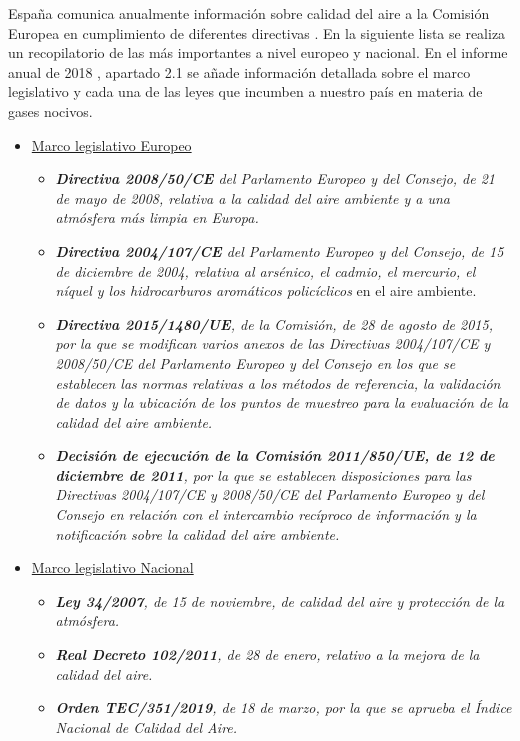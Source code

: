 España comunica anualmente información sobre calidad del aire a la Comisión Europea en cumplimiento de diferentes directivas . En la siguiente lista se realiza un recopilatorio de las más importantes a nivel europeo y nacional. En el informe anual de 2018 \cite{informe_2018}, apartado 2.1 se añade información detallada sobre el marco legislativo y cada una de las leyes que incumben a nuestro país en materia de gases nocivos.

\begin{itemize}
\item  \underline{Marco legislativo Europeo}
	\begin{itemize}
	\item \textit{\textbf{Directiva 2008/50/CE} del Parlamento Europeo y del Consejo, de 21 de mayo de 2008, relativa a la calidad del aire ambiente y a una atmósfera más limpia en Europa.}
	\item \textit{\textbf{Directiva 2004/107/CE} del Parlamento Europeo y del Consejo, de 15 de diciembre de 2004, relativa al arsénico, el cadmio, el mercurio, el níquel y los hidrocarburos aromáticos policíclicos}
	en el aire ambiente.
	\item \textit{\textbf{Directiva 2015/1480/UE}, de la Comisión, de 28 de agosto de 2015, por la que se modifican varios anexos de las Directivas 2004/107/CE y 2008/50/CE del Parlamento Europeo y del Consejo en los que se establecen las normas relativas a los métodos de referencia, la validación de datos y la ubicación de los puntos de muestreo para la evaluación de la calidad del aire ambiente.}
	\item \textit{\textbf{Decisión de ejecución de la Comisión 2011/850/UE, de 12 de diciembre de 2011}, por la que se establecen disposiciones para las Directivas 2004/107/CE y 2008/50/CE del Parlamento Europeo y del Consejo en relación con el intercambio recíproco de información y la notificación sobre la calidad del aire ambiente.}
	\end{itemize}
\item  \underline{Marco legislativo Nacional}
	\begin{itemize}
	\item \textit{\textbf{Ley 34/2007}, de 15 de noviembre, de calidad del aire y protección de la atmósfera.}
	\item \textit{\textbf{Real Decreto 102/2011}, de 28 de enero, relativo a la mejora de la calidad del aire.}
	\item \textit{\textbf{Orden TEC/351/2019}, de 18 de marzo, por la que se aprueba el Índice Nacional de Calidad del Aire.}
	\end{itemize}
\end{itemize}


